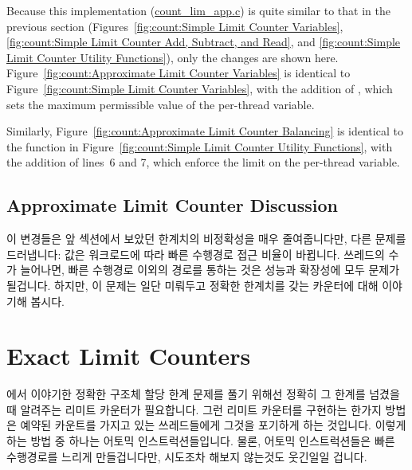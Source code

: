 Because this implementation (\url{count_lim_app.c}) is quite similar to
that in the previous section
(Figures~\ref{fig:count:Simple Limit Counter Variables},
\ref{fig:count:Simple Limit Counter Add, Subtract, and Read}, and
\ref{fig:count:Simple Limit Counter Utility Functions}),
only the changes are shown here.
Figure~\ref{fig:count:Approximate Limit Counter Variables}
is identical to
Figure~\ref{fig:count:Simple Limit Counter Variables},
with the addition of , which sets the maximum
permissible value of the per-thread  variable.

Similarly,
Figure~\ref{fig:count:Approximate Limit Counter Balancing}
is identical to the  function in
Figure~\ref{fig:count:Simple Limit Counter Utility Functions},
with the addition of lines~6 and 7, which enforce the
 limit on the per-thread  variable.
\fi

\subsection{Approximate Limit Counter Discussion}

이 변경들은 앞 섹션에서 보았던 한계치의 비정확성을 매우 줄여줍니다만, 다른
문제를 드러냅니다:  값은 워크로드에 따라 빠른 수행경로 접근
비율이 바뀝니다.
쓰레드의 수가 늘어나면, 빠른 수행경로 이외의 경로를 통하는 것은 성능과 확장성에
모두 문제가 될겁니다.
하지만, 이 문제는 일단 미뤄두고 정확한 한계치를 갖는 카운터에 대해 이야기해
봅시다.

\section{Exact Limit Counters}
\label{sec:count:Exact Limit Counters}

{\QQexactcnt} 에서 이야기한 정확한 구조체 할당 한계 문제를 풀기 위해선 정확히
그 한계를 넘겼을 때 알려주는 리미트 카운터가 필요합니다.
그런 리미트 카운터를 구현하는 한가지 방법은 예약된 카운트를 가지고 있는
쓰레드들에게 그것을 포기하게 하는 것입니다.
이렇게 하는 방법 중 하나는 어토믹 인스트럭션들입니다.
물론, 어토믹 인스트럭션들은 빠른 수행경로를 느리게 만들겁니다만, 시도조차
해보지 않는것도 웃긴일일 겁니다.
\iffalse

